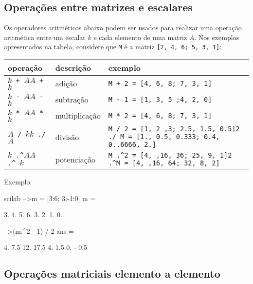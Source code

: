 \documentclass[11pt,fleqn]{practice}
\begin{document}
\subsection{Operações entre matrizes e escalares}

Os operadores aritméticos abaixo podem ser usados para realizar uma
operação aritmética entre um escalar $k$ e cada elemento de uma matriz $A$. 
Nos exemplos apresentados na tabela, considere que \texttt{M} é a matriz \texttt{[2, 4, 6; 5, 3, 1]}:
\begin{center}
  \begin{tabular}{p{2cm}lp{9cm}} \hline
    \textbf{operação} & \textbf{descrição} & \textbf{exemplo} \\\hline
    \texttt{$k$ + $A$}\newline \texttt{$A$ + $k$}  & adição & \texttt{M + 2 = [4, 6, 8; 7, 3, 1]} \\\hline
    \texttt{$k$ - $A$}\newline \texttt{$A$ - $k$}  & subtração & \texttt{M - 1 = [1, 3, 5 ;4, 2, 0]} \\\hline
    \texttt{$k$ * $A$}\newline \texttt{$A$ * $k$}  & multiplicação & \texttt{M * 2 = [4, 6, 8; 7, 3, 1]} \\\hline
    \texttt{$A$ / $k$}\newline \texttt{$k$ ./ $A$}  & divisão & \texttt{M / 2 = [1, 2 ,3; 2.5, 1.5, 0.5]}\newline  \texttt{2 ./ M = [1., 0.5, 0.333; 0.4, 0..6666, 2.]} \\\hline
    \texttt{$k$ .\textasciicircum $A$}\newline \texttt{$A$ .\textasciicircum\ $k$}  & potenciação & \texttt{M .\textasciicircum 2 = [4, ,16, 36; 25, 9, 1]}\newline \texttt{2 .\textasciicircum M = [4, ,16, 64; 32, 8, 2]} \\\hline
  \end{tabular}
\end{center}

Exemplo:
\begin{lst}{scilab}
-->m = [3:6; 3:-1:0]
 m  =
 
    3.    4.    5.    6.  
    3.    2.    1.    0.  
 
-->(m.^2 - 1) / 2
 ans  =
 
    4.    7.5    12.    17.5  
    4.    1.5    0.   - 0.5
\end{lst}

\subsection{Operações matriciais elemento a elemento}
\end{document}
